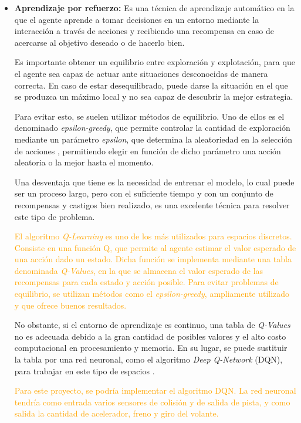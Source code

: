 \documentclass[a4paper,11pt]{book}
\begin{document}
\begin{itemize}
   \item \textbf{Aprendizaje por refuerzo:} Es una técnica de aprendizaje automático en la que el agente aprende a tomar decisiones en un entorno mediante la interacción a través de acciones %
   y recibiendo una recompensa en caso de acercarse al objetivo deseado o de hacerlo bien. 
   
   Es importante obtener un equilibrio entre exploración y explotación, para que el agente sea capaz de actuar ante situaciones desconocidas de manera correcta. En caso de estar desequilibrado, puede darse la situación en el que se produzca un máximo local y no sea capaz de descubrir la mejor estrategia.

   
   Para evitar esto, se suelen utilizar métodos de equilibrio. Uno de ellos es el denominado \textit{epsilon-greedy}, que permite controlar la cantidad de exploración mediante un parámetro \textit{epsilon}, que determina la aleatoriedad en la selección de acciones \cite{10.1007/978-3-642-24455-1_33}, permitiendo elegir en función de dicho parámetro una acción aleatoria o la mejor hasta el momento.

   Una desventaja que tiene es la necesidad de entrenar el modelo, lo cual puede ser un proceso largo, pero con el suficiente tiempo y con un conjunto de recompensas y castigos bien realizado, es una excelente técnica para resolver este tipo de problema.

   \textcolor{orange}{El algoritmo \textit{Q-Learning} es uno de los más utilizados para espacios discretos. Consiste en una función Q, que permite al agente estimar el valor esperado de una acción dado un estado. Dicha función se implementa mediante una tabla denominada \textit{Q-Values}, en la que se almacena el valor esperado de las recompensas para cada estado y acción posible. Para evitar problemas de equilibrio, se utilizan métodos como el \textit{epsilon-greedy}, ampliamente utilizado y que ofrece buenos resultados.}

   No obstante, si el entorno de aprendizaje es continuo, una tabla de \textit{Q-Values} no es adecuada debido a la gran cantidad de posibles valores y el alto costo computacional en procesamiento y memoria. En su lugar, se puede sustituir la tabla por una red neuronal, como el algoritmo \textit{Deep Q-Network} (DQN), para trabajar en este tipo de espacios \cite{coulom:tel-00003985}.

   \textcolor{orange}{Para este proyecto, se podría implementar el algoritmo DQN. La red neuronal tendría como entrada varios sensores de colisión y de salida de pista, y como salida la cantidad de acelerador, freno y giro del volante.}


\end{itemize}
\end{document}
